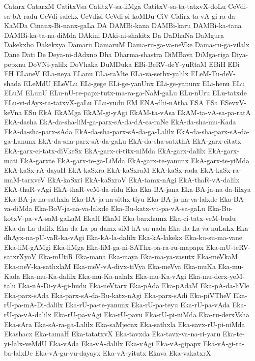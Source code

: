 {Catarx
CatarxM
CatitxVsa
CatitxV-sa-liMga
CatitxV-sa-ta-tatxvX-doLu
CeVdi-sa-bA-radu
CeVdi-salekx
CeVdisi
CeVdi-si-koMDu
CiV
Cidirx-ta-vA-gi-ra-da-KaMDa
Cinanx-Bi-nanx-gaLa
DA
DAMBi-kana
DAMBi-karu
DAMBi-ka-tana
DAMBi-ka-ta-na-diMda
DAkini
DAki-ni-shakitx
Da
DaDhaNa
DaMgura
Dakekxbo
Dakekxya
Damaru
DamaruM
Dama-ru-ga-va-neVke
Dama-ru-ga-vilalx
Dane
Dati
De
Deya-ni-dAdxno
Dha
Dharma-shastra
DiMBava
DiMga-riga
Diya-pepxnu
DoVNi-yalilx
DoVhaka
DuMDuka
EBi-BeRV-deY-yuRtaM
EBiH
EDi
EH
ELaneV
ELa-neya
ELanu
ELa-raMte
ELa-va-sethx-yalilx
ELeM-Tu-deV-shada
ELeMdU
ELeVLu
ELi-gege
ELi-ge-yanUnx
ELi-ge-yanunx
ELi-henu
ELu
ELuM
ELunU
ELu-nU-re-papx-tutx-ma-ra-ga-NaM-gaLu
ELu-nUru
ELu-tatxde
ELu-vi-dAyx-ta-tatxvX-gaLu
ELu-vudu
EM
ENA-dhi-nAtha
ESA
ESa
ESevxV-keVna
ESu
EkA
EkAMga
EkAM-gi-yAgi
EkAM-ta-vAsa
EkAM-ta-vA-sa-pa-ratA
EkA-dasha
EkA-da-sha-liM-ga-parx-sA-da-dA-ca-raNe
EkA-da-sha-mu-Kada
EkA-da-sha-parx-sAda
EkA-da-sha-parx-sA-da-ga-Lalilx
EkA-da-sha-parx-sA-da-ga-Lanunx
EkA-da-sha-parx-sA-da-gaLu
EkA-da-sha-satxthA
EkA-garx-citatx
EkA-garx-ci-tatx-diVkeSx
EkA-garx-ci-titx-niMda
EkA-garx-dalilx
EkA-garx-mati
EkA-garxte
EkA-garx-te-ga-LiMda
EkA-garx-te-yanunx
EkA-garx-te-yiMda
EkA-kaSx-rA-dayaH
EkA-kaSxra
EkA-kaSxraM
EkA-kaSx-rada
EkA-kaSx-ra-maM-tarxveV
EkA-kaSxri
EkA-kaSxroV
EkA-tamx-nAgi
EkA-thaR-vA-dalilx
EkA-thaR-vAgi
EkA-thaR-veM-da-ridu
Eka
Eka-BA-jana
Eka-BA-ja-na-da-lilxya
Eka-BA-ja-na-sathxla
Eka-BA-ja-na-sithx-tiyu
Eka-BA-ja-na-va-lalxde
Eka-BA-va-diMda
Eka-BoV-ja-na-va-lalxde
Eka-Bu-katx-vu-pa-vA-sa-gaLu
Eka-Bu-kotxV-pa-vA-saM-gaLaM
EkaH
EkaM
Eka-barxhamx
Eka-ci-tatx-veM-budu
Eka-da-La-dalilx
Eka-da-La-pa-damx-siM-hA-sa-nada
Eka-da-La-va-nuLaLx
Eka-dhAyx-na-pU-vaR-ka-vAgi
Eka-kA-la-dalilx
Eka-kA-lakekx
Eka-ku-su-ma-vane
Eka-liM-gAMgi
Eka-liMga
Eka-liM-ga-ni-SAThx-pa-ra-ru-mapapx
Eka-mU-teRV-satxrXyoV
Eka-mUtiR
Eka-mana
Eka-maya
Eka-ma-ya-vasutx
Eka-meVkaM
Eka-meV-ka-sathxlaM
Eka-meV-vA-divx-tiVya
Eka-meVva
Eka-muKa
Eka-mu-Kada
Eka-mu-Ka-dalilx
Eka-mu-Ka-nalalx
Eka-mu-Ka-vAgi
Eka-mu-derx-yeM-talu
Eka-nA-Di-yA-gi-hudu
Eka-neVtarx
Eka-pAda
Eka-pAdaM
Eka-pA-da-liVle
Eka-parx-sAda
Eka-parx-sA-da-Bu-katx-nAgi
Eka-parx-sAdi
Eka-piVTheV
Eka-rU-pa-mA-Di-dalilx
Eka-rU-pa-te-yanunx
Eka-rU-pa-teyu
Eka-rU-pa-vAda
Eka-rU-pa-vA-dalilx
Eka-rU-pa-vAgi
Eka-rU-pavu
Eka-rU-pi-niMda
Eka-ru-derxVsha
Eka-sAra
Eka-sA-ra-ga-Lalilx
Eka-saMjecnx
Eka-sathxla
Eka-savx-rU-pi-niMda
Ekashacx
Eka-tamaH
Eka-tatatxvX
Eka-tavxda
Eka-tavx-va-na-ri-yaru
Eka-te-yi-lalx-veMdU
Eka-vAda
Eka-vA-dalilx
Eka-vAgi
Eka-vA-gipapx
Eka-vA-gi-ra-ba-lalxDe
Eka-vA-gu-vu-dayayx
Eka-vA-yitutx
Ekava
Eka-vakatxrX
}
